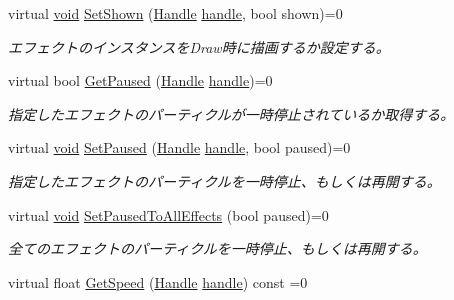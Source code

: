 \begin{DoxyCompactItemize}
virtual \mbox{\hyperlink{namespace_effekseer_ab34c4088e512200cf4c2716f168deb56}{void}} \mbox{\hyperlink{class_effekseer_1_1_manager_ad204b93de6e5c7a05c63cad0115c20d5}{Set\+Shown}} (\mbox{\hyperlink{namespace_effekseer_afba58b8d812da862190e9bbfc040824a}{Handle}} \mbox{\hyperlink{namespace_effekseer_afd99b336b206999bdcca3e431648efbc}{handle}}, bool shown)=0
\begin{DoxyCompactList}\small\item\em エフェクトのインスタンスを\+Draw時に描画するか設定する。 \end{DoxyCompactList}\item 
virtual bool \mbox{\hyperlink{class_effekseer_1_1_manager_af30924b879f3463d504991bf9780dfac}{Get\+Paused}} (\mbox{\hyperlink{namespace_effekseer_afba58b8d812da862190e9bbfc040824a}{Handle}} \mbox{\hyperlink{namespace_effekseer_afd99b336b206999bdcca3e431648efbc}{handle}})=0
\begin{DoxyCompactList}\small\item\em 指定したエフェクトのパーティクルが一時停止されているか取得する。 \end{DoxyCompactList}\item 
virtual \mbox{\hyperlink{namespace_effekseer_ab34c4088e512200cf4c2716f168deb56}{void}} \mbox{\hyperlink{class_effekseer_1_1_manager_a6414ea849302b7cef51b61a38c7ecd76}{Set\+Paused}} (\mbox{\hyperlink{namespace_effekseer_afba58b8d812da862190e9bbfc040824a}{Handle}} \mbox{\hyperlink{namespace_effekseer_afd99b336b206999bdcca3e431648efbc}{handle}}, bool paused)=0
\begin{DoxyCompactList}\small\item\em 指定したエフェクトのパーティクルを一時停止、もしくは再開する。 \end{DoxyCompactList}\item 
virtual \mbox{\hyperlink{namespace_effekseer_ab34c4088e512200cf4c2716f168deb56}{void}} \mbox{\hyperlink{class_effekseer_1_1_manager_a08c4c39a56fcc93b8acb284ff9bc933b}{Set\+Paused\+To\+All\+Effects}} (bool paused)=0
\begin{DoxyCompactList}\small\item\em 全てのエフェクトのパーティクルを一時停止、もしくは再開する。 \end{DoxyCompactList}\item 
virtual float \mbox{\hyperlink{class_effekseer_1_1_manager_ab42ee8a12f6c349af8bb658614d97489}{Get\+Speed}} (\mbox{\hyperlink{namespace_effekseer_afba58b8d812da862190e9bbfc040824a}{Handle}} \mbox{\hyperlink{namespace_effekseer_afd99b336b206999bdcca3e431648efbc}{handle}}) const =0

\end{DoxyCompactItemize}
